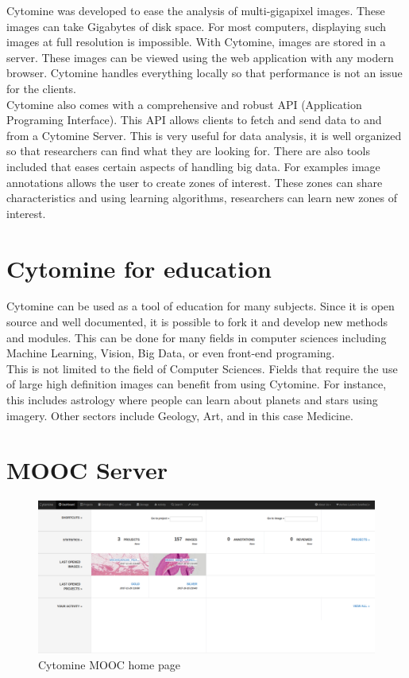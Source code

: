 \documentclass[a4paper,11pt]{report}
\numberwithin{figure}{section} %
\begin{document}
Cytomine was developed to ease the analysis of multi-gigapixel images.
These images can take Gigabytes of disk space.
For most computers, displaying such images at full resolution is impossible.
With Cytomine, images are stored in a server.
These images can be viewed using the web application with any modern browser.
Cytomine handles everything locally so that performance is not an issue for the clients.\\

	Cytomine also comes with a comprehensive and robust API (Application Programing Interface).
	This API allows clients to fetch and send data to and from a Cytomine Server.
	This is very useful for data analysis, it is well organized so that researchers can find what they are looking for.
	There are also tools included that eases certain aspects of handling big data.
	For examples image annotations allows the user to create zones of interest.
	These zones can share characteristics and using learning algorithms, researchers can learn new zones of interest.

\section{Cytomine for education}

Cytomine can be used as a tool of education for many subjects.
Since it is open source and well documented, it is possible to fork it and develop new methods and modules.
This can be done for many fields in computer sciences including Machine Learning, Vision, Big Data, or even front-end programing.\\

This is not limited to the field of Computer Sciences.
Fields that require the use of large high definition images can benefit from using Cytomine.
For instance, this includes astrology where people can learn about planets and stars using imagery.
Other sectors include Geology, Art, and in this case Medicine.


\section{MOOC Server}

      \begin{figure}[H]
      \centering
      \includegraphics[width=.95\linewidth]{images/cytomine_home.png}
      \caption{Cytomine MOOC home page}
      \end{figure}
\end{document}
